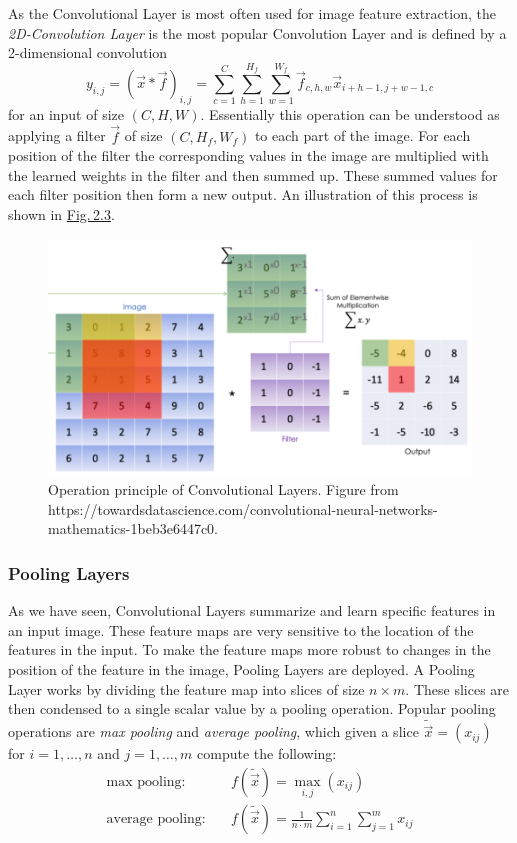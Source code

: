 As the Convolutional Layer is most often used for image feature extraction, the \textit{2D-Convolution Layer} is the most popular Convolution Layer and is defined by a 2-dimensional convolution
%
\begin{equation}
    y_{i,j}=(\vec{x}\ast\vec{f})_{i,j}=\sum_{c=1}^{C}\sum_{h=1}^{H_f}\sum_{w=1}^{W_f}\vec{f}_{c,h,w}\vec{x}_{i+h-1,j+w-1,c}
\end{equation}
%
for an input of size $(C,H,W)$. Essentially this operation can be understood as applying a filter $\vec{f}$ of size $(C, H_f, W_f)$ to each part of the image. For each position of the filter the corresponding values in the image are multiplied with the learned weights in the filter and then summed up. These summed values for each filter position then form a new output. An illustration of this process is shown in \hyperref[fig:2.3]{Fig.\,2.3}.
%
\begin{figure} \label{fig:2.3}
    \centering
    \includegraphics[width=.65\textwidth]{Chapters/figures/convolution.PNG}
    \caption[Operation principle of Convolutional Layers]{Operation principle of Convolutional Layers. Figure from\\ https://towardsdatascience.com/convolutional-neural-networks-mathematics-1beb3e6447c0.}
\end{figure}
%
\subsubsection{Pooling Layers}
As we have seen, Convolutional Layers summarize and learn specific features in an input image. These feature maps are very sensitive to the location of the features in the input. To make the feature maps more robust to changes in the position of the feature in the image, Pooling Layers are deployed. A Pooling Layer works by dividing the feature map into slices of size $n\times m$. These slices are then condensed to a single scalar value by a pooling operation. Popular pooling operations are \textit{max pooling} and \textit{average pooling}, which given a slice $\tilde{\vec{x}}=(x_{ij})$ for $i=1,\dots,n$ and $j=1,\dots,m$ compute the following:
%
\begin{align}
    \text{max pooling:}\quad&f(\tilde{\vec{x}})=\underset{i,j}{\max}(x_{ij})\\
    \text{average pooling:}\quad&f(\tilde{\vec{x}})=\frac{1}{n\cdot m}\sum_{i=1}^n\sum_{j=1}^mx_{ij}
\end{align}

